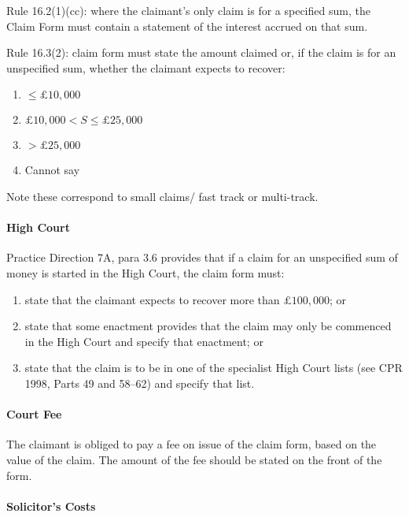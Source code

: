 \documentclass[
]{article}
\providecommand{\tightlist}{%
  \setlength{\itemsep}{0pt}\setlength{\parskip}{0pt}}
\begin{document}
Rule 16.2(1)(cc): where the claimant's only claim is for a specified
sum, the Claim Form must contain a statement of the interest accrued on
that sum.

Rule 16.3(2): claim form must state the amount claimed or, if the claim
is for an unspecified sum, whether the claimant expects to recover:

\begin{enumerate}
\def\labelenumi{\arabic{enumi}.}
\tightlist
\item
  \(\leq £10,000\)
\item
  \(£10,000 < S \leq £25,000\)
\item
  \(>£25,000\)
\item
  Cannot say
\end{enumerate}

Note these correspond to small claims/ fast track or multi-track.

\hypertarget{high-court-1}{%
\paragraph{High Court}\label{high-court-1}}

Practice Direction 7A, para 3.6 provides that if a claim for an
unspecified sum of money is started in the High Court, the claim form
must:

\begin{enumerate}
\def\labelenumi{\arabic{enumi}.}
\tightlist
\item
  state that the claimant expects to recover more than \(£100,000\); or
\item
  state that some enactment provides that the claim may only be
  commenced in the High Court and specify that enactment; or
\item
  state that the claim is to be in one of the specialist High Court
  lists (see CPR 1998, Parts 49 and 58--62) and specify that list.
\end{enumerate}

\hypertarget{court-fee}{%
\paragraph{Court Fee}\label{court-fee}}

The claimant is obliged to pay a fee on issue of the claim form, based
on the value of the claim. The amount of the fee should be stated on the
front of the form.

\hypertarget{solicitors-costs}{%
\paragraph{Solicitor's Costs}\label{solicitors-costs}}
\end{document}
